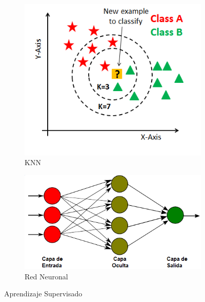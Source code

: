 		
		\begin{figure}[!h]
			\centering
			
			
			\begin{subfigure}[t]{0.4\textwidth}
				\centering
				\includegraphics[width=\textwidth]{images/chapter_2/knn}
				\caption{KNN}
				\label{fig:knn}
			\end{subfigure}
			\hfill
			\begin{subfigure}[t]{0.5\textwidth}
				\centering
				\includegraphics[width=\textwidth]{images/chapter_2/redneu}
				\caption{Red Neuronal}
				\label{fig:redneu}
			\end{subfigure}
			
			\caption{Aprendizaje Supervisado}
			\label{fig:aprendizajeSupervisado}
		\end{figure}

